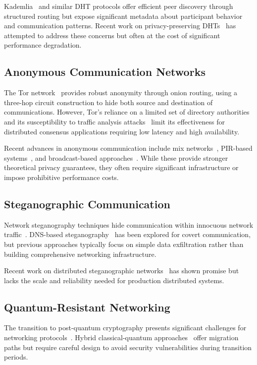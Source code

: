 \documentclass[11pt,a4paper]{article}
\theoremstyle{definition}
\theoremstyle{remark}
\begin{document}
Kademlia~\cite{kademlia} and similar DHT protocols offer efficient peer discovery through structured routing but expose significant metadata about participant behavior and communication patterns. Recent work on privacy-preserving DHTs~\cite{private-dhts} has attempted to address these concerns but often at the cost of significant performance degradation.

\subsection{Anonymous Communication Networks}

The Tor network~\cite{tor-design} provides robust anonymity through onion routing, using a three-hop circuit construction to hide both source and destination of communications. However, Tor's reliance on a limited set of directory authorities and its susceptibility to traffic analysis attacks~\cite{tor-attacks} limit its effectiveness for distributed consensus applications requiring low latency and high availability.

Recent advances in anonymous communication include mix networks~\cite{mixnets}, PIR-based systems~\cite{pir-anonymous}, and broadcast-based approaches~\cite{dissent}. While these provide stronger theoretical privacy guarantees, they often require significant infrastructure or impose prohibitive performance costs.

\subsection{Steganographic Communication}

Network steganography techniques hide communication within innocuous network traffic~\cite{network-steganography}. DNS-based steganography~\cite{dns-steganography} has been explored for covert communication, but previous approaches typically focus on simple data exfiltration rather than building comprehensive networking infrastructure.

Recent work on distributed steganographic networks~\cite{distributed-steganography} has shown promise but lacks the scale and reliability needed for production distributed systems.

\subsection{Quantum-Resistant Networking}

The transition to post-quantum cryptography presents significant challenges for networking protocols~\cite{pqc-networks}. Hybrid classical-quantum approaches~\cite{hybrid-crypto} offer migration paths but require careful design to avoid security vulnerabilities during transition periods.
\end{document}
